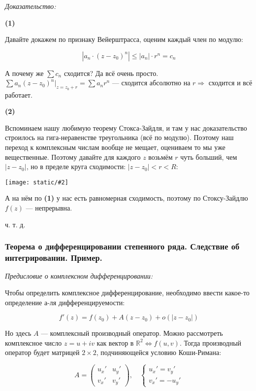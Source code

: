 \documentclass{article}
\def\images#1#2{\begin{center}\texttt{[image: static/\#2]}\end{center}}
\begin{document}
\textit{Доказательство:}

\textbf{(1)}

Давайте докажем по признаку Вейерштрасса, оценим каждый член по модулю:

\[\left|a_n \cdot (z - z_0)^n\right| \le |a_n| \cdot r^n = c_n\]

А почему же $\sum c_n$ сходится? Да всё очень просто. $\sum a_n (z - z_0)^n|_{z = z_0 + r} = \sum a_n r^n$ --- сходится абсолютно на $r \Rightarrow$ сходится и всё работает.

\textbf{(2)}

Вспоминаем нашу любимую теорему Стокса-Зайдля, и там у нас доказательство строилось на гига-неравенстве треугольника (всё по модулю). Поэтому наш переход к комплексным числам вообще не мещает, оцениваем то мы уже вещественные. Поэтому давайте для каждого $z$ возьмём $r$ чуть больший, чем $|z - z_0|$, но в пределе круга сходимости: $|z - z_0| < r < R$: 

\images{0.3}{st_r_nepr.png}

А на нём по \textbf{(1)} у нас есть равномерная сходимость, поэтому по Стоксу-Зайдлю $f(z)$ --- непрерывна.

ч. т. д. 


\subsubsection{Теорема о дифференцировании степенного ряда. Следствие об интегрировании. Пример.}

\textit{Предисловие о комплексном дифференцировании:} 

Чтобы определить комплексное дифференцирование, необходимо ввести какое-то определение а-ля дифференцируемости: 

\[f'(z) = f(z_0) + A(z - z_0) + o(|z - z_0|)\]

Но здесь $A$ --- комплексный производный оператор. Можно рассмотреть комплексное число $z = u + iv$ как вектор в $\mathbb{R}^2 \Leftrightarrow f(u, v)$. Тогда производный оператор будет матрицей $2 \times 2$, подчиняющейся условию Коши-Римана: 

\[A = \begin{pmatrix}
    u_x' & u_y' \\
    v_x' & v_y'
\end{pmatrix}, \quad \begin{cases}
    u_x' = v_y' \\
    v_x' = -u_y'
\end{cases}\]
\end{document}
